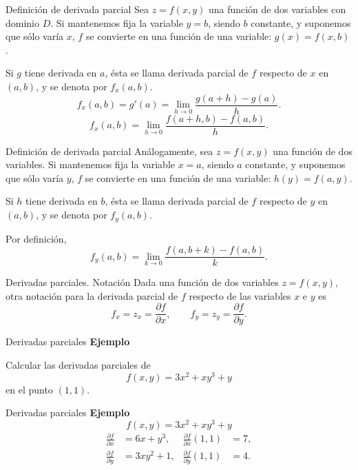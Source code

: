 \documentclass[main.tex]{subfiles}
\begin{document}
\graphicspath{{imagenes/tema3/}{../imagenes/tema3/}}

\begin{frame}{Definición de derivada parcial}
Sea $z=f(x,y)$ una función de dos variables con dominio $D$. Si mantenemos fija la variable $y=b$, siendo $b$ constante, y suponemos que sólo varía $x$, $f$ se convierte en una función de una variable: $g(x)=f(x,b)$.
\medskip

Si $g$ tiene derivada en $a$, ésta se llama derivada parcial de $f$ respecto de $x$ en $(a,b)$, y se denota por $f_x(a,b)$.
\[f_x(a,b)=g'(a)=\lim_{h\to0}\frac{g(a+h)-g(a)}h.\]
\[f_x(a,b)=\lim_{h\to0}\frac{f(a+h,b)-f(a,b)}h.\]
\end{frame}
\begin{frame}{Definición de derivada parcial}
Análogamente, sea $z=f(x,y)$ una función de dos variables. Si mantenemos fija la variable $x=a$, siendo $a$ constante, y suponemos que sólo varía $y$, $f$ se convierte en una función de una variable: $h(y)=f(a,y)$.
\medskip

Si $h$ tiene derivada en $b$, ésta se llama derivada parcial de $f$ respecto de $y$ en $(a,b)$, y se denota por $f_y(a,b)$.
\medskip

Por definición,
\[f_y(a,b)=\lim_{k\to0}\frac{f(a,b+k)-f(a,b)}k.\]
\end{frame}
\begin{frame}{Derivadas parciales. Notación}
Dada una función de dos variables $z=f(x,y)$, otra notación para la derivada parcial de $f$ respecto de las variables $x$ e $y$ es
\[f_x=z_x=\frac{\partial f}{\partial x},\qquad f_y=z_y=\frac{\partial f}{\partial y}.\]
\end{frame}
\begin{frame}{Derivadas parciales}
\textbf{Ejemplo}\par Calcular las derivadas parciales de\[f(x,y)=3x^2+xy^3+y\]
en el punto $(1,1)$.
\end{frame}
\begin{frame}{Derivadas parciales}
\textbf{Ejemplo}\[f(x,y)=3x^2+xy^3+y\]
\[\begin{aligned}
\frac{\partial f}{\partial x}&=6x+y^3,&\frac{\partial f}{\partial x}(1,1)&=7,\\[3mm]
\frac{\partial f}{\partial y}&=3xy^2+1,&\frac{\partial f}{\partial y}(1,1)&=4.
\end{aligned}\]
\end{frame}
\end{document}
